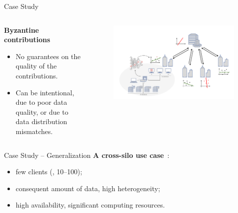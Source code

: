 \begin{frame}{Case Study}
\begin{columns}
    \begin{column}{0.4\textwidth}
      \textbf{Byzantine contributions}
      \begin{itemize}
        \item No guarantees on the quality of the contributions.
        \item Can be intentional, due to poor data quality, or due to data distribution mismatches.
      \end{itemize}
    \end{column}
    
    \begin{column}{0.6\textwidth}
      \begin{figure}
        \centering
        \includegraphics[width=\linewidth]{figures/intro/poisoning.drawio.pdf}
      \end{figure}
    \end{column}
  \end{columns}
\end{frame}

\begin{frame}{Case Study -- Generalization}
  \textbf{A cross-silo use case}~\cite{kairouz_AdvancesOpenProblems_2021}:
  \begin{itemize}
    \item few clients (\ie, 10--100);
    \item consequent amount of data, high heterogeneity;
    \item high availability, significant computing resources.
  \end{itemize}
\end{frame}

